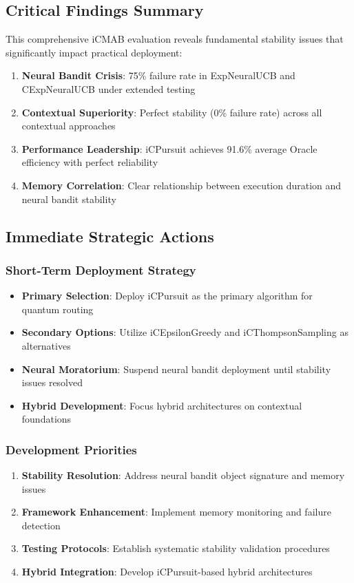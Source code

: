 \documentclass[12pt,a4paper]{article}
\newcommand{\performance}[1]{\textcolor{performancecolor}{\textbf{#1}}}
\newcommand{\critical}[1]{\textcolor{criticalcolor}{\textbf{#1}}}
\newcommand{\success}[1]{\textcolor{successcolor}{\textbf{#1}}}
\newcommand{\warning}[1]{\textcolor{warningcolor}{\textbf{#1}}}
\begin{document}
\subsection{Critical Findings Summary}

This comprehensive iCMAB evaluation reveals fundamental stability issues that significantly impact practical deployment:

\begin{enumerate}
\item \critical{\textbf{Neural Bandit Crisis}}: 75\% failure rate in ExpNeuralUCB and CExpNeuralUCB under extended testing
\item \success{\textbf{Contextual Superiority}}: Perfect stability (0\% failure rate) across all contextual approaches  
\item \performance{\textbf{Performance Leadership}}: iCPursuit achieves 91.6\% average Oracle efficiency with perfect reliability
\item \warning{\textbf{Memory Correlation}}: Clear relationship between execution duration and neural bandit stability
\end{enumerate}

\subsection{Immediate Strategic Actions}

\subsubsection{Short-Term Deployment Strategy}
\begin{itemize}
\item \textbf{Primary Selection}: Deploy iCPursuit as the primary algorithm for quantum routing
\item \textbf{Secondary Options}: Utilize iCEpsilonGreedy and iCThompsonSampling as alternatives
\item \textbf{Neural Moratorium}: Suspend neural bandit deployment until stability issues resolved
\item \textbf{Hybrid Development}: Focus hybrid architectures on contextual foundations
\end{itemize}

\subsubsection{Development Priorities}
\begin{enumerate}
\item \critical{\textbf{Stability Resolution}}: Address neural bandit object signature and memory issues
\item \textbf{Framework Enhancement}: Implement memory monitoring and failure detection
\item \textbf{Testing Protocols}: Establish systematic stability validation procedures
\item \textbf{Hybrid Integration}: Develop iCPursuit-based hybrid architectures
\end{enumerate}
\end{document}
